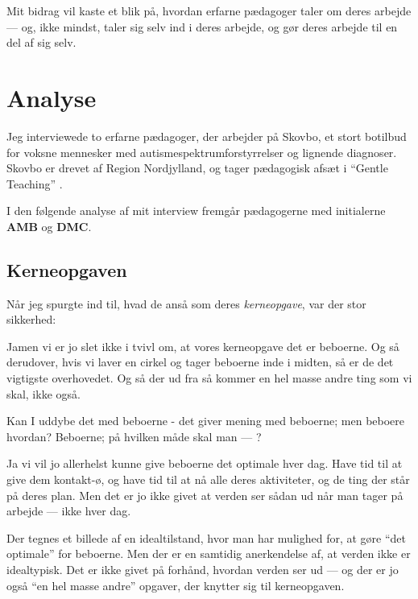 Mit bidrag vil kaste et blik på, hvordan erfarne pædagoger taler om deres arbejde — og, ikke mindst, taler sig selv ind i deres arbejde, og gør deres arbejde til en del af sig selv.

\section{Analyse}

Jeg interviewede to erfarne pædagoger, der arbejder på Skovbo, et stort botilbud for voksne mennesker med autismespektrumforstyrrelser og lignende diagnoser.
Skovbo er drevet af Region Nordjylland, og tager pædagogisk afsæt i 
“Gentle Teaching” \autocite{sodisbakkeAutismespektrumforstyrrelser2019}.

I den følgende analyse af mit interview fremgår pædagogerne med initialerne \textbf{AMB} og \textbf{DMC}.

\subsection{Kerneopgaven}

Når jeg spurgte ind til, hvad de anså som deres \textit{kerneopgave}, var der stor sikkerhed:
\begin{description}
\DMC Jamen vi er jo slet ikke i tvivl om, at vores kerneopgave det er beboerne.
Og så derudover, hvis vi laver en cirkel og tager beboerne inde i midten, så er de det vigtigste overhovedet.
Og så der ud fra så kommer en hel masse andre ting som vi skal, ikke også.

\MAA
Kan I uddybe det med beboerne - det giver mening med beboerne; men beboere hvordan? Beboerne; på hvilken måde skal man — ?

\AMB
Ja vi vil jo allerhelst kunne give beboerne det optimale hver dag. Have tid til at give dem kontakt-ø, og have tid til at nå alle deres aktiviteter, og de ting der står på deres plan. 
Men det er jo ikke givet at verden ser sådan ud når man tager på arbejde — ikke hver dag.
\end{description}

Der tegnes et billede af en idealtilstand, hvor man har mulighed for, at gøre “det optimale” for beboerne.
Men der er en samtidig anerkendelse af, at verden ikke er idealtypisk.
Det er ikke givet på forhånd, hvordan verden ser ud — og der er jo også “en hel masse andre” opgaver, der knytter sig til kerneopgaven.

